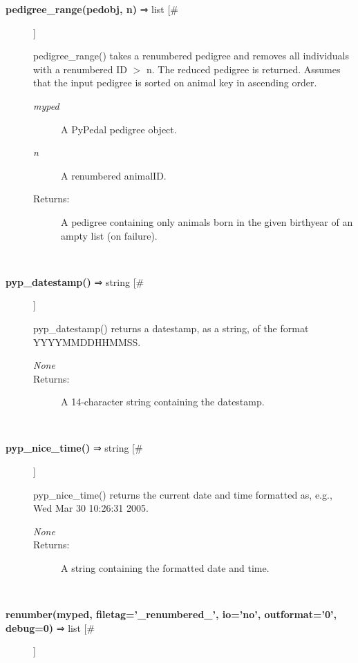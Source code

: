 \documentclass[10pt]{article}
\begin{document}
\begin{description}
\item[\textbf{pedigree\_range(pedobj, n)}
 ⇒ list [\#]]

 pedigree\_range() takes a renumbered pedigree and removes all individuals with a renumbered ID $>$ n. The reduced pedigree is returned. Assumes that the input pedigree is sorted on animal key in ascending order.
\begin{description}
\item[\emph{myped}
] A PyPedal pedigree object.
\item[\emph{n}
] A renumbered animalID.
\item[Returns:] A pedigree containing only animals born in the given birthyear of an ampty list (on failure).

\end{description}
\\ 

\item[\textbf{pyp\_datestamp()}
 ⇒ string [\#]]

 pyp\_datestamp() returns a datestamp, as a string, of the format YYYYMMDDHHMMSS.
\begin{description}
\item[\emph{None}
]
\item[Returns:] A 14-character string containing the datestamp.

\end{description}
\\ 

\item[\textbf{pyp\_nice\_time()}
 ⇒ string [\#]]

 pyp\_nice\_time() returns the current date and time formatted as, e.g., Wed Mar 30 10:26:31 2005.
\begin{description}
\item[\emph{None}
]
\item[Returns:] A string containing the formatted date and time.

\end{description}
\\ 

\item[\textbf{renumber(myped, filetag='\_renumbered\_', io='no', outformat='0', debug=0)}
 ⇒ list [\#]]


\end{description}
\end{document}

